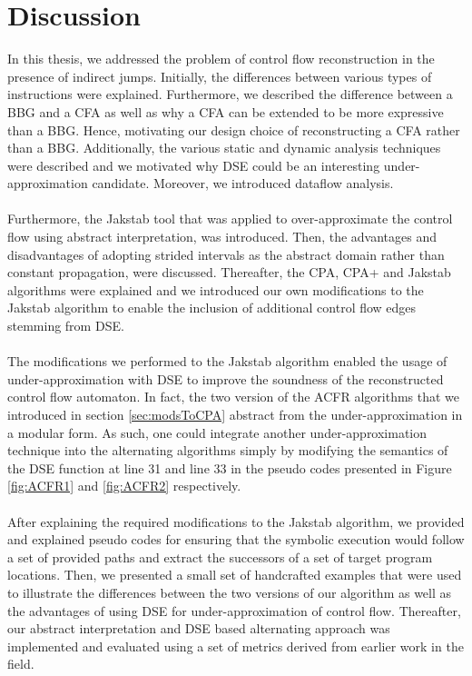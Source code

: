 \documentclass{kththesis}
\begin{document}
\section{Discussion}
In this thesis, we addressed the problem of control flow reconstruction in the presence of indirect jumps. Initially, the differences between various types of instructions were explained. Furthermore, we described the difference between a BBG and a CFA as well as why a CFA can be extended to be more expressive than a BBG. Hence, motivating our design choice of reconstructing a CFA rather than a BBG. Additionally, the various static and dynamic analysis techniques were described and we motivated why DSE could be an interesting under-approximation candidate. Moreover, we introduced dataflow analysis.
\\ \\
Furthermore, the Jakstab tool that was applied to over-approximate the control flow using abstract interpretation, was introduced. Then, the advantages and disadvantages of adopting strided intervals as the abstract domain rather than constant propagation, were discussed. Thereafter, the CPA, CPA+ and Jakstab algorithms were explained and we introduced our own modifications to the Jakstab algorithm to enable the inclusion of additional control flow edges stemming from DSE.
\\ \\ 
The modifications we performed to the Jakstab algorithm enabled the usage of under-approximation with DSE to improve the soundness of the reconstructed control flow automaton. In fact, the two version of the ACFR algorithms that we introduced in section \ref{sec:modsToCPA} abstract from the under-approximation in a modular form. As such, one could integrate another under-approximation technique into the alternating algorithms simply by modifying the semantics of the DSE function at line 31 and line 33 in the pseudo codes presented in Figure \ref{fig:ACFR1} and \ref{fig:ACFR2} respectively.
\\ \\
After explaining the required modifications to the Jakstab algorithm, we provided and explained pseudo codes for ensuring that the symbolic execution would follow a set of provided paths and extract the successors of a set of target program locations. Then, we presented a small set of handcrafted examples that were used to illustrate the differences between the two versions of our algorithm as well as the advantages of using DSE for under-approximation of control flow. Thereafter, our abstract interpretation and DSE based alternating approach was implemented and evaluated using a set of metrics derived from earlier work in the field.
\end{document}
